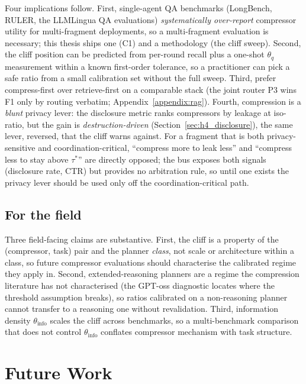 Four implications follow. First, single-agent QA benchmarks
(LongBench, RULER, the LLMLingua QA evaluations)
\emph{systematically over-report} compressor utility for
multi-fragment deployments, so a multi-fragment evaluation is
necessary; this thesis ships one (C1) and a methodology (the cliff
sweep). Second, the cliff position can be predicted from per-round
recall plus a one-shot $\theta_q$ measurement within a known
first-order tolerance, so a practitioner can pick a safe ratio from a
small calibration set without the full sweep. Third, prefer
compress-first over retrieve-first on a comparable stack (the joint
router P3 wins F1 only by routing verbatim;
Appendix~\ref{appendix:rag}). Fourth, compression is a \emph{blunt}
privacy lever: the disclosure metric ranks compressors by leakage at
iso-ratio, but the gain is \emph{destruction-driven}
(Section~\ref{sec:h4_disclosure}), the same lever, reversed, that
the cliff warns against. For a fragment that is both
privacy-sensitive and coordination-critical, ``compress more to leak
less'' and ``compress less to stay above $\tau^{*}$'' are directly
opposed; the bus exposes both signals (disclosure rate, CTR) but
provides no arbitration rule, so until one exists the privacy lever
should be used only off the coordination-critical path.

\subsection{For the field}

Three field-facing claims are substantive. First, the cliff is a
property of the (compressor, task) pair and the planner \emph{class},
not scale or architecture within a class, so future compressor
evaluations should characterise the calibrated regime they apply in.
Second, extended-reasoning planners are a regime the compression
literature has not characterised (the GPT-oss diagnostic locates
where the threshold assumption breaks), so ratios calibrated on a
non-reasoning planner cannot transfer to a reasoning one without
revalidation. Third, information density $\theta_\text{info}$ scales
the cliff across benchmarks, so a multi-benchmark comparison that
does not control $\theta_\text{info}$ conflates compressor mechanism
with task structure.

\section{Future Work}
\label{sec:future}


